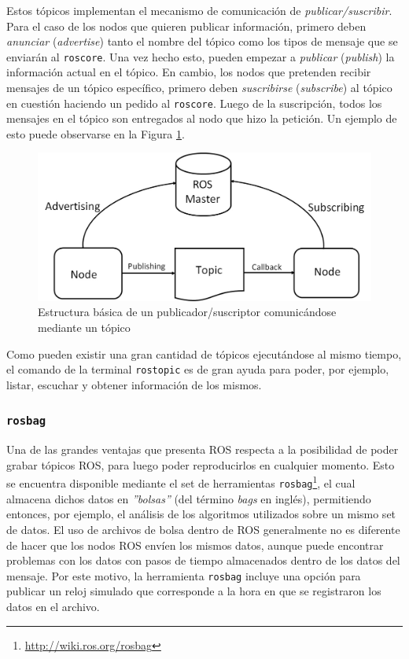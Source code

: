 Estos tópicos implementan el mecanismo de comunicación de \textit{publicar/suscribir}. Para el caso de los nodos que quieren publicar información, primero deben \textit{anunciar} (\textit{advertise}) tanto el nombre del tópico como los tipos de mensaje que se enviarán al \texttt{roscore}. Una vez hecho esto, pueden empezar a \textit{publicar} (\textit{publish}) la información actual en el tópico. En cambio, los nodos que pretenden recibir mensajes de un tópico específico, primero deben \textit{suscribirse} (\textit{subscribe}) al tópico en cuestión haciendo un pedido al \texttt{roscore}. Luego de la suscripción, todos los mensajes en el tópico son entregados al nodo que hizo la petición. Un ejemplo de esto puede observarse en la Figura \ref{fig:rostopics}.
\begin{figure}
    \centering
    \includegraphics[width=\linewidth]{Img/ROSTopics.jpg}
    \caption{Estructura básica de un publicador/suscriptor comunicándose mediante un tópico}
    \label{fig:rostopics}
\end{figure}

Como pueden existir una gran cantidad de tópicos ejecutándose al mismo tiempo, el comando de la terminal \texttt{rostopic} es de gran ayuda para poder, por ejemplo, listar, escuchar y obtener información de los mismos.

\subsubsection{\texttt{rosbag}}
Una de las grandes ventajas que presenta ROS respecta a la posibilidad de poder grabar tópicos ROS, para luego poder reproducirlos en cualquier momento. Esto se encuentra disponible mediante el set de herramientas \texttt{rosbag}\footnote{\url{http://wiki.ros.org/rosbag}}, el cual almacena dichos datos en \textit{''bolsas''} (del término \textit{bags} en inglés), permitiendo entonces, por ejemplo, el análisis de los algoritmos utilizados sobre un mismo set de datos. El uso de archivos de bolsa dentro de ROS generalmente no es diferente de hacer que los nodos ROS envíen los mismos datos, aunque puede encontrar problemas con los datos con pasos de tiempo almacenados dentro de los datos del mensaje. Por este motivo, la herramienta \texttt{rosbag} incluye una opción para publicar un reloj simulado que corresponde a la hora en que se registraron los datos en el archivo.

